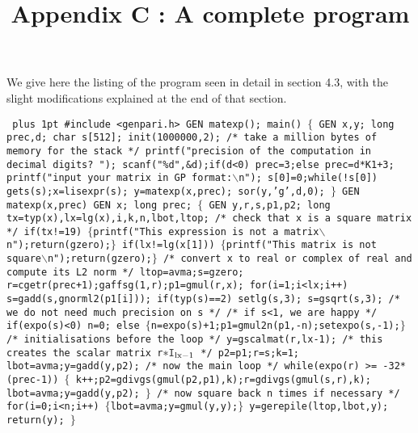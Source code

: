 \title{Appendix C : A complete program}

We give here the listing of the program seen in detail in section 4.3,
with the slight modifications explained at the end of that section.

{\tt \obeylines\parskip=0pt plus 1pt
\hbox{}
\#include <genpari.h>
\hbox{}
GEN matexp();
\hbox{}
main()
$\{$
\quad GEN x,y;
\quad long prec,d;
\quad char s[512];
\hbox{}
\quad init(1000000,2); /* take a million bytes of memory for the stack */
\quad printf("precision of the computation in decimal digits? ");
\quad scanf("\%d",\&d);if(d<0) prec=3;else prec=d*K1+3;
\quad printf("input your matrix in GP format:$\backslash$n");
\quad s[0]=0;while(!s[0]) gets(s);x=lisexpr(s);
\quad y=matexp(x,prec);
\quad sor(y,'g',d,0);
$\}$
\hbox{}
GEN matexp(x,prec)
\qquad GEN x;
\qquad long prec;
\hbox{}
$\{$
\quad GEN y,r,s,p1,p2;
\quad long tx=typ(x),lx=lg(x),i,k,n,lbot,ltop;
\hbox{}
/* check that x is a square matrix */
\hbox{}
\quad if(tx!=19) $\{$printf("This expression is not a matrix$\backslash$n");return(gzero);$\}$
\quad if(lx!=lg(x[1])) $\{$printf("This matrix is not square$\backslash$n");return(gzero);$\}$
\hbox{}
/* convert x to real or complex of real and compute its L2 norm */
\hbox{}
\quad ltop=avma;s=gzero;
\quad r=cgetr(prec+1);gaffsg(1,r);p1=gmul(r,x);
\quad for(i=1;i<lx;i++) s=gadd(s,gnorml2(p1[i]));
\quad if(typ(s)==2) setlg(s,3);
\quad s=gsqrt(s,3); /* we do not need much precision on s */
\hbox{}
/* if s<1, we are happy */
\hbox{}
\quad if(expo(s)<0) n=0;
\quad else $\{$n=expo(s)+1;p1=gmul2n(p1,-n);setexpo(s,-1);$\}$
\hbox{}
/* initialisations before the loop */
\hbox{}
\quad y=gscalmat(r,lx-1); /* this creates the scalar matrix r$*{\tt I_{\text {lx-1}}}$ */
\quad p2=p1;r=s;k=1;
\quad lbot=avma;y=gadd(y,p2);
\hbox{}
/* now the main loop */
\hbox{}
\quad while(expo(r) >= -32*(prec-1))
\quad $\{$
\qquad k++;p2=gdivgs(gmul(p2,p1),k);r=gdivgs(gmul(s,r),k);
\qquad lbot=avma;y=gadd(y,p2);
\quad $\}$
\hbox{}
/* now square back n times if necessary */
\hbox{}
\quad for(i=0;i<n;i++) $\{$lbot=avma;y=gmul(y,y);$\}$
\quad y=gerepile(ltop,lbot,y);
\quad return(y);
$\}$
}

\vfill\eject
